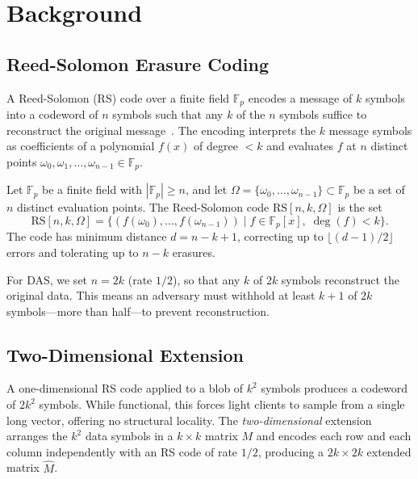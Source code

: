 \section{Background}

\label{sec:background}

\subsection{Reed-Solomon Erasure Coding}

A Reed-Solomon (RS) code over a finite field $\mathbb{F}_p$ encodes a message of $k$ symbols
into a codeword of $n$ symbols such that any $k$ of the $n$ symbols suffice to reconstruct the
original message~\cite{reed1960polynomial}. The encoding interprets the $k$ message symbols
as coefficients of a polynomial $f(x)$ of degree $< k$ and evaluates $f$ at $n$ distinct
points $\omega_0, \omega_1, \ldots, \omega_{n-1} \in \mathbb{F}_p$.

\begin{definition}
Let $\mathbb{F}_p$ be a finite field with $|\mathbb{F}_p| \geq n$, and let
$\Omega = \{\omega_0, \ldots, \omega_{n-1}\} \subset \mathbb{F}_p$ be a set of $n$ distinct
evaluation points. The Reed-Solomon code $\text{RS}[n, k, \Omega]$ is the set
\[
    \text{RS}[n,k,\Omega] = \{(f(\omega_0), \ldots, f(\omega_{n-1})) \mid f \in \mathbb{F}_p[x],\; \deg(f) < k\}.
\]
The code has minimum distance $d = n - k + 1$, correcting up to $\lfloor(d-1)/2\rfloor$ errors
and tolerating up to $n - k$ erasures.
\end{definition}

For DAS, we set $n = 2k$ (rate $1/2$), so that any $k$ of $2k$ symbols reconstruct the
original data. This means an adversary must withhold at least $k + 1$ of $2k$ symbols---more
than half---to prevent reconstruction.

\subsection{Two-Dimensional Extension}

A one-dimensional RS code applied to a blob of $k^2$ symbols produces a codeword of $2k^2$
symbols. While functional, this forces light clients to sample from a single long vector,
offering no structural locality. The \emph{two-dimensional} extension arranges the $k^2$ data
symbols in a $k \times k$ matrix $M$ and encodes each row and each column independently with
an RS code of rate $1/2$, producing a $2k \times 2k$ extended matrix $\hat{M}$.

